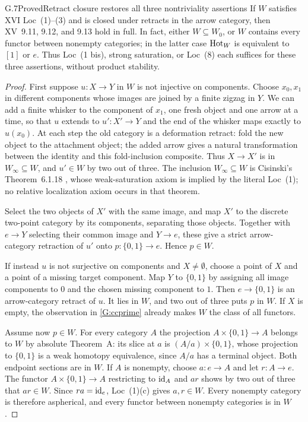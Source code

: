 \begin{claim}{G.7}{Proved}{Retract closure restores all three nontriviality assertions}
\label{G:retract-restoration}
If $W$ satisfies XVI Loc~(1)--(3) and is closed under retracts in the
arrow category, then XV~9.11, 9.12, and 9.13 hold in full.  In fact,
either $W\subseteq W_0$, or $W$ contains every functor between
nonempty categories; in the latter case $\operatorname{Hot}_W$ is equivalent to
$[1]$ or $e$.  Thus Loc~(1 bis), strong saturation, or Loc~(8) each
suffices for these three assertions, without product stability.
\end{claim}
\begin{proof}
First suppose $u:X\to Y$ in $W$ is not injective on components.
Choose $x_0,x_1$ in different components whose images are joined by
a finite zigzag in $Y$.  We can add a finite whisker to the component
of $x_1$, one fresh object and one arrow at a time, so that $u$ extends
to $u':X'\to Y$ and the end of the whisker maps exactly to $u(x_0)$.
At each step the old category is a deformation retract: fold the
new object to the attachment object; the added arrow gives a natural
transformation between the identity and this fold-inclusion composite.
Thus $X\to X'$ is in $W_\infty\subseteq W$, and $u'\in W$ by two
out of three.  The inclusion $W_\infty\subseteq W$ is Cisinski's
Theorem~6.1.18 \cite{Cisinski2006}, whose weak-saturation axiom is implied by the literal
Loc~(1); no relative localization axiom occurs in that theorem.

Select the two objects of $X'$ with the same image, and map $X'$ to
the discrete two-point category by its components, separating those
objects.  Together with $e\to Y$ selecting their common image and
$Y\to e$, these give a strict arrow-category retraction of $u'$
onto $p:\{0,1\}\to e$.  Hence $p\in W$.

If instead $u$ is not surjective on components and $X\ne\emptyset$,
choose a point of $X$ and a point of a missing target component.
Map $Y$ to $\{0,1\}$ by assigning all image components to $0$ and
the chosen missing component to $1$.  Then $e\to\{0,1\}$ is an
arrow-category retract of $u$.  It lies in $W$, and two out of three
puts $p$ in $W$.  If $X$ is empty, the observation in
\ref{G:ccprime} already makes $W$ the class of all functors.

Assume now $p\in W$.  For every category $A$ the projection
$A\times\{0,1\}\to A$ belongs to $W$ by absolute Theorem~A:
its slice at $a$ is $(A/a)\times\{0,1\}$, whose projection to
$\{0,1\}$ is a weak homotopy equivalence, since $A/a$ has a terminal
object.  Both endpoint sections are in $W$.  If $A$ is nonempty,
choose $a:e\to A$ and let $r:A\to e$.  The functor
$A\times\{0,1\}\to A$ restricting to $\mathrm{id}_A$ and $ar$ shows by
two out of three that $ar\in W$.  Since $ra=\mathrm{id}_e$, Loc~(1)(c)
gives $a,r\in W$.  Every nonempty category is therefore aspherical,
and every functor between nonempty categories is in $W$.


\end{proof}

